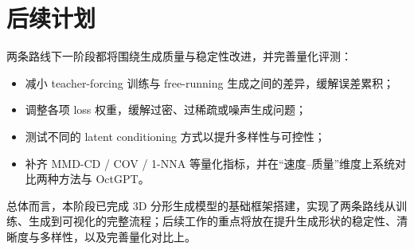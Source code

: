 \documentclass{article}
\begin{document}
\section{后续计划}
两条路线下一阶段都将围绕生成质量与稳定性改进，并完善量化评测：
\begin{itemize}
    \item 减小 teacher-forcing 训练与 free-running 生成之间的差异，缓解误差累积；
    \item 调整各项 loss 权重，缓解过密、过稀疏或噪声生成问题；
    \item 测试不同的 latent conditioning 方式以提升多样性与可控性；
    \item 补齐 MMD-CD / COV / 1-NNA 等量化指标，并在“速度--质量”维度上系统对比两种方法与 OctGPT。
\end{itemize}
总体而言，本阶段已完成 3D 分形生成模型的基础框架搭建，实现了两条路线从训练、生成到可视化的完整流程；后续工作的重点将放在提升生成形状的稳定性、清晰度与多样性，以及完善量化对比上。
\end{document}
